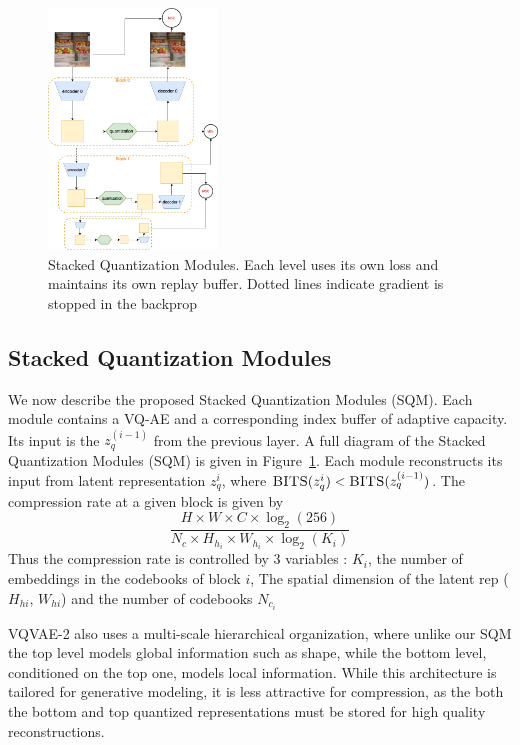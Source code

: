 \documentclass[colorinlistoftodos]{article} %
\begin{document}
\begin{figure}
    \centering
    \includegraphics[width=0.4\textwidth]{figs/sqm_cartoon.png}
    \caption{Stacked Quantization Modules. Each level uses its own loss and maintains its own replay buffer. Dotted lines indicate gradient is stopped in the backprop}
    \label{fig:soft_modules}
\end{figure}

\subsection{Stacked Quantization Modules}
We now describe the proposed Stacked Quantization Modules (SQM). Each module contains a VQ-AE and a corresponding index buffer of adaptive capacity. Its input is the $z_q^{(i-1)}$ from the previous layer. A full diagram of the Stacked Quantization Modules (SQM) is given in Figure~\ref{fig:soft_modules}. Each module reconstructs its input from latent representation $z_q^{i}$, where $\textsc{BITS}(z_q^{i}) < \textsc{BITS}(z_q^{(i-1)})$. The compression rate at a given block is given by
$$
    \frac{H \times W \times C \times  \log_2{(256)}}
         {N_c \times H_h_i \times W_h_i \times \log_2{(K_i)}}
$$
Thus the compression rate is controlled by 3 variables : $K_i$, the number of embeddings in the codebooks of block $i$, The spatial dimension of the latent rep ($H_{hi}$, $W_{hi}$) and the number of codebooks $N_c_i$ 

VQVAE-2 \citep{razavi2019generating} also uses a multi-scale hierarchical organization, where unlike our SQM the top level models global information such as shape, while the bottom level, conditioned on the top one, models local information. While this architecture is tailored for generative modeling, it is less attractive for compression, as the both the bottom and top quantized representations must be stored for high quality reconstructions.
\end{document}
